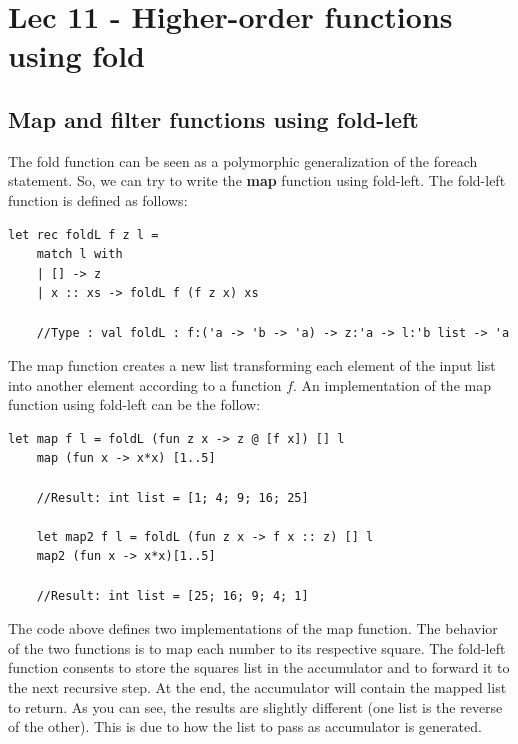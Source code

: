\chapter{Lec 11 - Higher-order functions using fold}

\section{Map and filter functions using fold-left}
The fold function can be seen as a polymorphic generalization of the foreach statement. So, we can try to write the \textbf{map} function using fold-left.\newline\newline
The fold-left function is defined as follows:
\begin{lstlisting}[style = FSharpStyle]
    let rec foldL f z l =
    match l with
    | [] -> z
    | x :: xs -> foldL f (f z x) xs

    //Type : val foldL : f:('a -> 'b -> 'a) -> z:'a -> l:'b list -> 'a
\end{lstlisting}
The map function creates a new list transforming each element of the input list into another element according to a function $f$.\newline\newline
An implementation of the map function using fold-left can be the follow:
\begin{lstlisting}[style = FSharpStyle]
    let map f l = foldL (fun z x -> z @ [f x]) [] l
    map (fun x -> x*x) [1..5]

    //Result: int list = [1; 4; 9; 16; 25]

    let map2 f l = foldL (fun z x -> f x :: z) [] l
    map2 (fun x -> x*x)[1..5]

    //Result: int list = [25; 16; 9; 4; 1]
\end{lstlisting}
The code above defines two implementations of the map function. The behavior of the two functions is to map each number to its respective square. The fold-left function consents to store the squares list in the accumulator and to forward it to the next recursive step. At the end, the accumulator will contain the mapped list to return. As you can see, the results are slightly different (one list is the reverse of the other). This is due to how the list to pass as accumulator is generated. 
